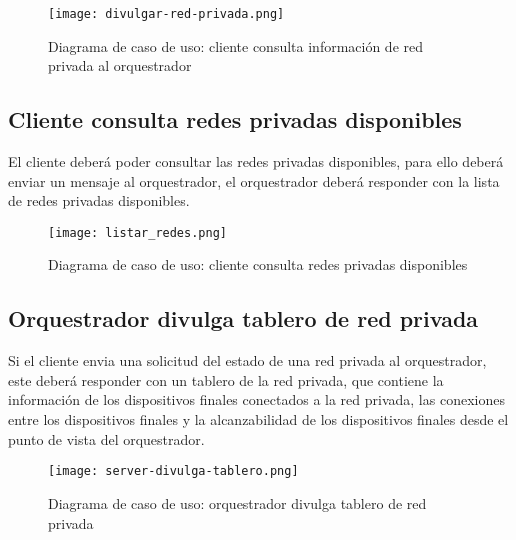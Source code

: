 \begin{figure}[h!]
    \centering
    \texttt{[image: divulgar-red-privada.png]}
    \caption{Diagrama de caso de uso: cliente consulta información de red privada al orquestrador}
\end{figure}


\subsection{Cliente consulta redes privadas disponibles}
El cliente deberá poder consultar las redes privadas disponibles, para ello deberá enviar un mensaje al orquestrador, el orquestrador deberá responder con la lista de redes privadas disponibles.

\begin{figure}[h!]
    \centering
    \texttt{[image: listar\_redes.png]}
    \caption{Diagrama de caso de uso: cliente consulta redes privadas disponibles}
\end{figure}

\subsection{Orquestrador divulga tablero de red privada}
Si el cliente envia una solicitud del estado de una red privada al orquestrador, este deberá responder con un tablero de la red privada, que contiene la información de los dispositivos finales conectados a la red privada, las conexiones entre los dispositivos finales y la alcanzabilidad de los dispositivos finales desde el punto de vista del orquestrador.

\begin{figure}[h!]
    \centering
    \texttt{[image: server-divulga-tablero.png]}
    \caption{Diagrama de caso de uso: orquestrador divulga tablero de red privada}
\end{figure}

